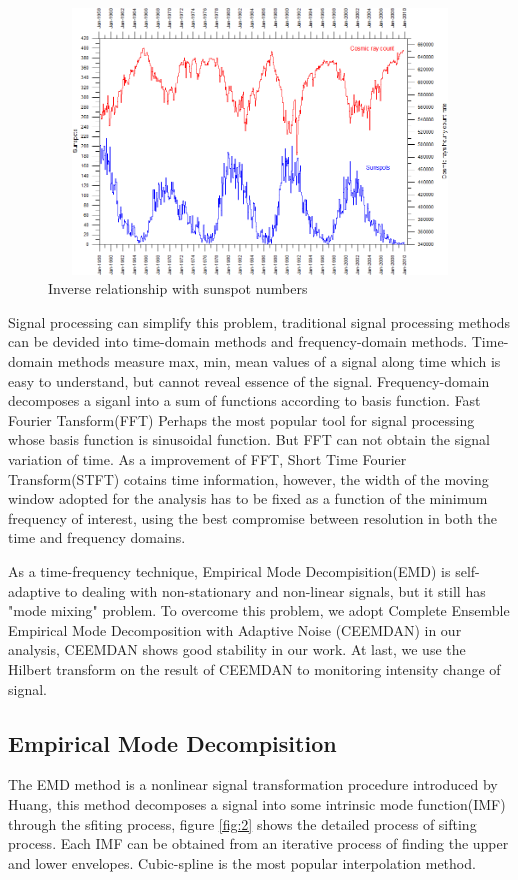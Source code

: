 \documentclass[draft]{agujournal2019}
\begin{document}
\begin{figure}[h]
\includegraphics[width=400pt,height=200pt]{img//CosmicRaysAndSunspotsMonthlySince195801.png}
\caption{Inverse relationship with sunspot numbers}
\end{figure}

Signal processing can simplify this problem, traditional signal processing methods can be devided into time-domain methods and frequency-domain methods. Time-domain methods measure max, min, mean values of a signal along time which is easy to understand, but cannot reveal essence of the signal. Frequency-domain decomposes a siganl into a sum of functions according to basis function. Fast Fourier Tansform(FFT) Perhaps the most popular tool for signal processing whose basis function is sinusoidal function. But FFT can not obtain the signal variation of time. As a improvement of FFT, Short Time Fourier Transform(STFT) cotains time information, however, the width of the moving window adopted for the analysis has to be fixed as a function of the minimum frequency of interest, using the best compromise between resolution in both the time and frequency domains\cite{Ditommaso2012}. 

As a time-frequency technique, Empirical Mode Decompisition(EMD) is self-adaptive to dealing with non-stationary and non-linear signals, but it still has "mode mixing" problem. To overcome this problem, we adopt Complete Ensemble Empirical Mode Decomposition with Adaptive Noise (CEEMDAN) in our analysis, CEEMDAN shows good stability in our work. At last, we use the Hilbert transform on the result of CEEMDAN to monitoring intensity change of signal.

\subsection{Empirical Mode Decompisition}
The EMD method is a nonlinear signal transformation procedure introduced by Huang\cite{Huang1998}, this method decomposes a signal into some intrinsic mode function(IMF) through the sfiting process, figure \ref{fig:2} shows the detailed process of sifting process. Each IMF can be obtained from an iterative process of finding the upper and lower envelopes. Cubic-spline is the most popular interpolation method. 
\end{document}
